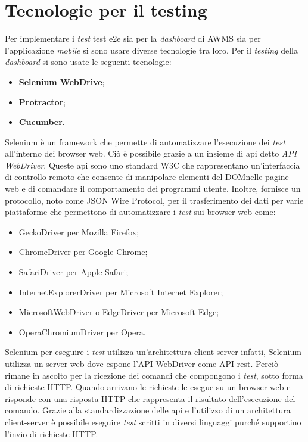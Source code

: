\section{Tecnologie per il testing}
Per implementare i \emph{test} \gls{test e2e} sia per la \emph{dashboard} di \gls{AWMS} sia per l'applicazione \emph{mobile} si sono usare diverse tecnologie tra loro. Per il \emph{testing} della \emph{dashboard} si sono usate le seguenti tecnologie:
\begin{itemize}
	\item \textbf{Selenium WebDrive};
	\item \textbf{Protractor};
	\item \textbf{Cucumber}.
\end{itemize}
Selenium è un \gls{framework}\ap{[g]} che permette di automatizzare l'esecuzione dei \emph{test} all'interno dei \gls{browser web}\ap{[g]}. Ciò è possibile grazie a un insieme di \gls{api}\ap{[g]} detto \emph{API WebDriver}. Queste \gls{api}\ap{[g]} sono uno standard \gls{W3C} che rappresentano un'interfaccia di controllo remoto che consente di manipolare elementi del \gls{DOM}\glsfirstoccur nelle pagine web e di comandare il comportamento dei programmi utente. Inoltre, fornisce un protocollo, noto come JSON Wire Protocol, per il trasferimento dei dati per varie piattaforme che permettono di automatizzare i \emph{test} sui \gls{browser web}\ap{[g]} come:
\begin{itemize}
	\item GeckoDriver per Mozilla Firefox;
	\item ChromeDriver per Google Chrome;
	\item SafariDriver per Apple Safari;
	\item InternetExplorerDriver per Microsoft Internet Explorer;
	\item MicrosoftWebDriver o EdgeDriver per Microsoft Edge;
	\item OperaChromiumDriver per Opera.
\end{itemize}
Selenium per eseguire i \emph{test} utilizza un’architettura client-server infatti, Selenium utilizza un server web dove espone l'API WebDriver come API \gls{rest}\glsfirstoccur. Perciò rimane in ascolto per la ricezione dei comandi che compongono i \emph{test}, sotto forma di richieste HTTP. Quando arrivano le richieste le esegue su un \gls{browser web}\ap{[g]} e risponde con una risposta HTTP che rappresenta il risultato dell'esecuzione del comando. Grazie alla standardizzazione delle \gls{api}\ap{[g]} e l'utilizzo di un architettura client-server è possibile eseguire \emph{test} scritti in diversi linguaggi purché supportino l'invio di richieste HTTP.\\

